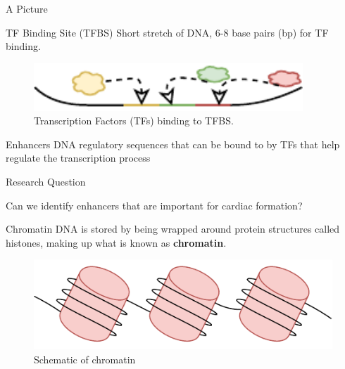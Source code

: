 \documentclass{beamer}
\begin{document}
    \begin{frame}{A Picture}
    \begin{block}{TF Binding Site (TFBS)}
            Short stretch of DNA, 6-8 base pairs (bp) for TF binding.
            \end{block}
        \begin{figure}
            \centering
            \includegraphics[width = 0.9\textwidth]{tfBinding.pdf}
            \caption{Transcription Factors (TFs) binding to TFBS.}
            \label{fig:yeet}
        \end{figure}
         \begin{block}{Enhancers}
            DNA regulatory sequences that can be bound to by TFs that help regulate the transcription process
        \end{block}
    \end{frame}
    
      \begin{frame}{Research Question}
           
        \begin{center}
            Can we identify enhancers that are important for cardiac formation?
        \end{center}
   \end{frame}
   
    \begin{frame}{Chromatin}
        DNA is stored by being wrapped around protein structures called histones, making up what is known as \textbf{chromatin}.
        \begin{figure}
            \centering
            \includegraphics{Chromatin.pdf}
            \caption{Schematic of chromatin}%
            \label{fig:chromatin}
        \end{figure}
    \end{frame}
    
\end{document}
